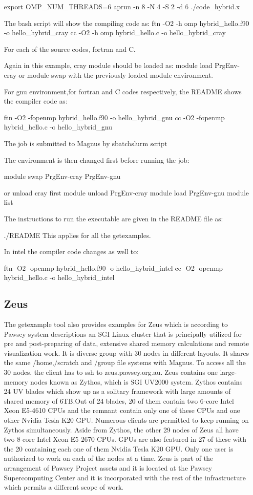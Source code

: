 \documentclass[journal]{IEEEtran}
\begin{document}
export OMP_NUM_THREADS=6
aprun -n 8 -N 4 -S 2 -d 6 ./code_hybrid.x

The bash script will show the compiling code as:
ftn -O2 -h omp hybrid_hello.f90 -o hello_hybrid_cray
cc -O2 -h omp hybrid_hello.c -o hello_hybrid_cray

For each of the source codes, fortran and C.

Again in this example, cray module should be loaded as:
module load PrgEnv-cray or module swap with the previously loaded module environment.

For gnu environment,for fortran and C codes respectively, the README shows the compiler code as:

ftn -O2 -fopenmp hybrid_hello.f90 -o hello_hybrid_gnu
cc -O2 -fopenmp hybrid_hello.c -o hello_hybrid_gnu

The job is submitted to Magnus by sbatch{slurm script}

The environment is then changed first before running the job:

module swap PrgEnv-cray PrgEnv-gnu

or unload cray first
module unload PrgEnv-cray
module load PrgEnv-gnu
module list

The instructions to run the executable are given in the README  file as:

./README 
This applies for all the getexamples.

In intel the compiler code changes as well to:

ftn -O2 -openmp hybrid_hello.f90 -o hello_hybrid_intel
cc -O2 -openmp hybrid_hello.c -o hello_hybrid_intel


\subsection{Zeus}

The getexample tool also provides examples for Zeus which is according to Pawsey system descriptions an SGI Linux cluster that is principally utilized 
for pre and post-preparing of data, extensive shared memory calculations and remote visualization work. It is diverse group with 30 nodes in different layouts. It shares the same /home,/scratch and 
/group file systems with Magnus. To access all the 30 nodes, the client has to ssh to zeus.pawsey.org.au.
Zeus contains one large-memory nodes known as Zythos, which is SGI UV2000 system. Zythos contains 24 UV blades which show up as a solitary framework 
with large amounts of shared memory of 6TB.Out of 24 blades, 20 of them contain two 6-core Intel Xeon E5-4610 CPUs and the remnant contain only one of 
these CPUs and one other Nvidia Tesla K20 GPU. Numerous clients are permitted to keep running on Zythos simultaneously. Aside from Zythos, the other 29 
nodes of Zeus all have two 8-core Intel Xeon E5-2670 CPUs. GPUs are also featured in 27 of these with the 20 containing each one of them Nvidia Tesla 
K20 GPU. Only one user is authorized to work on each of the nodes at a time. Zeus is part of the arrangement of Pawsey Project assets and it is located at 
the Pawsey Supercomputing Center and it is incorporated with the rest of the infrastructure which permits a different scope of work.
 
\end{document}
